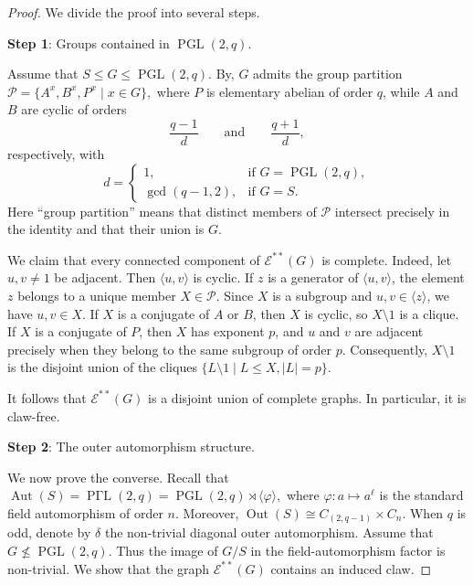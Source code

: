 \documentclass[preprint,11pt]{elsarticle}
\begin{document}
\begin{proof}
	We divide the proof into several steps.
	
	\medskip
	
	\textbf{Step 1}: Groups contained in $\operatorname{PGL}(2,q)$.
	
	Assume that $S\leq G\leq \operatorname{PGL}(2,q)$. By\cite[Sätze 8.2, 8.3 and 8.5]{Endliche-gruppen-I-Huppert}, $G$ admits the group partition $\mathcal P=\{A^x,B^x,P^x\mid x\in G\},$ where $P$ is elementary abelian of order $q$, while $A$ and $B$ are cyclic of orders $$\frac{q-1}{d}\qquad\text{and}\qquad \frac{q+1}{d},$$ respectively, with $$d=\begin{cases}1,&\text{if }G=\operatorname{PGL}(2,q),\\\gcd(q-1,2),&\text{if }G=S.\end{cases}$$ Here “group partition” means that distinct members of $\mathcal P$ intersect precisely in the identity and that their union is $G$.
	
	We claim that every connected component of $\mathcal E^{**}(G)$ is complete. Indeed, let $u,v\neq 1$ be adjacent. Then $\langle u,v\rangle$ is cyclic. If $z$ is a generator of $\langle u,v\rangle$, the element $z$ belongs to a unique member $X\in\mathcal P$. Since $X$ is a subgroup and $u,v\in\langle z\rangle$, we have $u,v\in X$.
	If $X$ is a conjugate of $A$ or $B$, then $X$ is cyclic, so $X\setminus{1}$ is a clique. If $X$ is a conjugate of $P$, then $X$ has exponent $p$, and $u$ and $v$ are adjacent precisely when they belong to the same subgroup of order $p$. Consequently, $X\setminus{1}$ is the disjoint union of the cliques $\{L\setminus{1}\mid L\leq X, |L|=p\}.$
	
	It follows that $\mathcal E^{**}(G)$ is a disjoint union of complete graphs. In particular, it is claw-free.
	
	


	
	\medskip
	\noindent
	\textbf{Step 2}: The outer automorphism structure.
	
	We now prove the converse.  Recall that
$
	\operatorname{Aut}(S)
	=\operatorname{P\Gamma L}(2,q)
	=\operatorname{PGL}(2,q)\rtimes\langle\varphi\rangle,
$
	where
$
	\varphi:a\longmapsto a^\ell
$
	is the standard field automorphism of order $n$.  Moreover,
$
	\operatorname{Out}(S)
	\cong C_{(2,q-1)}\times C_n.
$
	When $q$ is odd, denote by $\delta$ the non-trivial diagonal
	outer automorphism.
	Assume that
$
	G\not\leq \operatorname{PGL}(2,q).
$
	Thus the image of $G/S$ in the field-automorphism factor is
	non-trivial.  We show that
	the graph $\mathcal{E}^{**}(G)$ contains an induced claw.
	

\end{proof}
\end{document}

